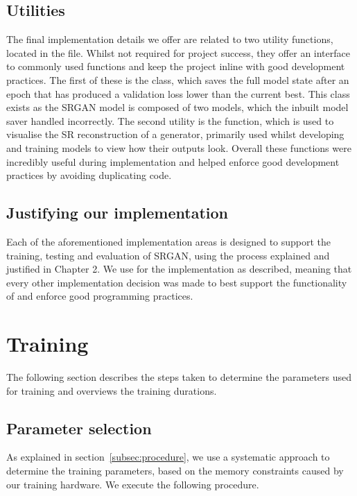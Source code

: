 \subsection{Utilities}
The final implementation details we offer are related to two utility functions, located in the  file. Whilst not required for project success, they offer an interface to commonly used functions and keep the project inline with good development practices. The first of these is the  class, which saves the full model state after an epoch that has produced a validation loss lower than the current best. This class exists as the SRGAN model is composed of two models, which the inbuilt  model saver handled incorrectly. The second utility is the  function, which is used to visualise the SR reconstruction of a generator, primarily used whilst developing and training models to view how their outputs look. Overall these functions were incredibly useful during implementation and helped enforce good development practices by avoiding duplicating code.

\subsection{Justifying our implementation}
Each of the aforementioned implementation areas is designed to support the training, testing and evaluation of SRGAN, using the process explained and justified in Chapter 2. We use  for the implementation as described, meaning that every other implementation decision was made to best support the functionality of  and enforce good programming practices.

\section{Training}
The following section describes the steps taken to determine the parameters used for training and overviews the training durations.

\subsection{Parameter selection}\label{subsec:parameter_selection}
As explained in section~\ref{subsec:procedure}, we use a systematic approach to determine the training parameters, based on the memory constraints caused by our training hardware. We execute the following procedure.

